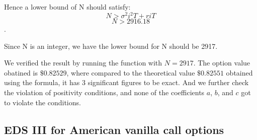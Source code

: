Hence a lower bound of N should satisfy: $$N > \sigma^2 i^2 T + r i T$$ $$N > 2916.18$$. 

Since N is an integer, we have the lower bound for N should be 2917.

We verified the result by running the function with $N = 2917$. The option value obatined is $\$0.82529$, where compared to the theoretical value $\$0.82551$ obtained using the formula, it has 3 significant figures to be exact. And we further check the violation of positivity conditions, and none of the coefficients $a$, $b$, and $c$ got to violate the conditions.

\subsection{EDS III for American vanilla call options}


